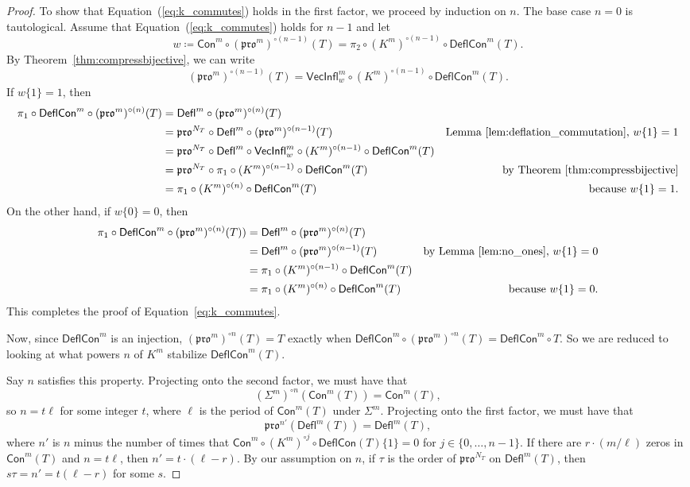 \documentclass[12pt]{amsart}
\theoremstyle{definition}
\theoremstyle{remark}
\numberwithin{equation}{section}
\newcommand{\pro}{\mathfrak{pro}}
\newcommand{\deflate}{\ensuremath{\mathsf{Defl}}}
\newcommand{\inflate}{\ensuremath{\mathsf{VecInfl}}}
\newcommand{\content}{\ensuremath{\mathsf{Con}}}
\newcommand{\compress}{\ensuremath{\mathsf{DeflCon}}}
\begin{document}
\begin{proof}
To show that Equation~(\ref{eq:k_commutes}) holds in the first factor, we proceed by induction on $n$. The base case $n = 0$ is tautological. Assume that Equation~(\ref{eq:k_commutes}) holds for $n-1$ and let \[ w \coloneqq \content^m \circ (\pro^m)^{\circ (n-1)}(T) = \pi_2 \circ (K^m)^{\circ (n-1)} \circ \compress^m(T). \]  By Theorem~\ref{thm:compressbijective}, we can write
\[ (\pro^m)^{\circ (n-1)}(T) = \inflate^m_w \circ (K^m)^{\circ (n-1)} \circ \compress^m(T).\] 
If $w\lbrace 1 \rbrace = 1 $, then
\begin{align*}
\pi_1 \circ \compress^m \circ (\pro^m)^{\circ (n)}(T) &= \deflate^m \circ (\pro^m)^{\circ (n)}(T) \\
&= \pro^{N_T} \circ \deflate^m \circ (\pro^m)^{\circ (n-1)}(T) &\text{Lemma~\ref{lem:deflation_commutation}, $w\lbrace 1 \rbrace = 1$} \\
&= \pro^{N_T} \circ \deflate^m \circ \inflate^m_{w} \circ (K^m)^{\circ (n-1)} \circ \compress^m(T)  \\
&= \pro^{N_T} \circ \pi_1 \circ (K^m)^{\circ (n-1)} \circ \compress^m(T) &\text{by Theorem~\ref{thm:compressbijective}} \\ 
&= \pi_1 \circ (K^m)^{\circ (n)} \circ \compress^m(T) &\text{because $w\lbrace 1 \rbrace = 1$.}
\end{align*}
On the other hand, if $w \lbrace 0 \rbrace = 0$, then 
\begin{align*}
\pi_1 \circ \compress^m \circ (\pro^m)^{\circ (n)}(T)) &= \deflate^m \circ (\pro^m)^{\circ (n)}(T) \\
&= \deflate^m \circ (\pro^m)^{\circ (n-1)}(T) &\text{by Lemma~\ref{lem:no_ones}, $w \lbrace 1 \rbrace = 0$} \\
&= \pi_1  \circ (K^m)^{\circ (n-1)} \circ \compress^m(T)  \\
&= \pi_1 \circ (K^m)^{\circ (n)} \circ \compress^m(T) &\text{because $w\lbrace 1 \rbrace = 0$.}
\end{align*}
This completes the proof of Equation~\ref{eq:k_commutes}.

Now, since $\compress^m$ is an injection, $(\pro^m)^{\circ n}(T) = T$ exactly when $\compress^m \circ (\pro^m)^{\circ n}(T) = \compress^m \circ T$. So we are reduced to looking at what powers $n$ of $K^m$ stabilize $\compress^m(T)$.
 

 
Say $n$ satisfies this property. Projecting onto the second factor, we must have that \[ (\Sigma^m)^{\circ n}(\content^m(T)) = \content^m(T), \] so $n = t \ell$ for some integer $t$, where $\ell$ is the period of $\content^m(T)$ under $\Sigma^m$.  Projecting onto the first factor, we must have that  \[ \pro^{n'}(\deflate^m(T)) = \deflate^m(T), \] where $n'$ is $n$ minus the number of times that $\content^m \circ (K^m)^{\circ j} \circ \compress(T) \lbrace 1 \rbrace = 0$ for $j \in \{ 0, \dots, n-1 \}$. If there are $r \cdot (m/\ell)$ zeros in $\content^m(T)$ and $n = t \ell$, then $n' = t \cdot(\ell - r)$. By our assumption on $n$, if $\tau$ is the order of $\pro^{N_T}$ on $\deflate^m(T)$, then $s \tau = n' = t(\ell - r)$ for some $s$.


\end{proof}
\end{document}
